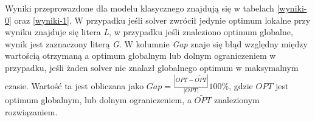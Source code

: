 Wyniki przeprowazdone dla modelu klasycznego znajdują się w tabelach \ref{wyniki-0} oraz \ref{wyniki-1}. W przypadku jeśli solver zwrócił jedynie 
optimum lokalne przy wyniku znajduje się litera \textit{L}, w przypadku jeśli znaleziono optimum globalne, wynik jest zaznaczony literą \textit{G}. 
W kolumnie \textit{Gap} znaje się błąd względny między wartością otrzymaną a optimum globalnym lub dolnym ograniczeniem w przypadku, jeśli żaden 
solver nie znalazł globalnego optimum w maksymalnym czasie. Wartość ta jest obliczana jako $Gap = \frac{|OPT - \widetilde{OPT}|}{|OPT|} 100 \%$, gdzie 
$OPT$ jest optimum globalnym, lub dolnym ograniczeniem, a $\widetilde{OPT}$ znalezionym rozwiązaniem.

\begin{table}[H]
    \begin{center}
\end{center}
\end{table}
